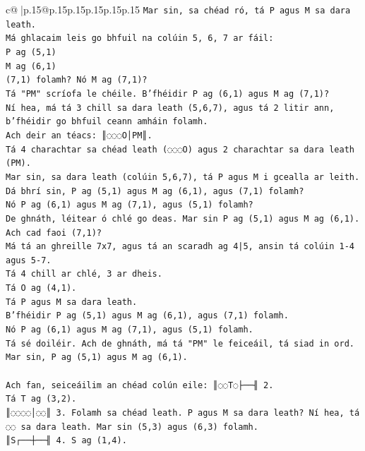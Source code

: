\documentclass{article}
\begin{document}
{\begin{supertabular}{c@{$\;$}|p{.15\linewidth}@{}p{.15\linewidth}p{.15\linewidth}p{.15\linewidth}p{.15\linewidth}p{.15\linewidth}}
{{{\texttt{Mar sin, sa chéad ró, tá P agus M sa dara leath.} \\
\texttt{Má ghlacaim leis go bhfuil na colúin 5, 6, 7 ar fáil:} \\
\texttt{P ag (5,1)} \\
\texttt{M ag (6,1)} \\
\texttt{(7,1) folamh? Nó M ag (7,1)?} \\
\texttt{Tá "PM" scríofa le chéile. B'fhéidir P ag (6,1) agus M ag (7,1)?} \\
\texttt{Ní hea, má tá 3 chill sa dara leath (5,6,7), agus tá 2 litir ann, b'fhéidir go bhfuil ceann amháin folamh.} \\
\texttt{Ach deir an téacs: ║◌◌◌O│PM║.} \\
\texttt{Tá 4 charachtar sa chéad leath (◌◌◌O) agus 2 charachtar sa dara leath (PM).} \\
\texttt{Mar sin, sa dara leath (colúin 5,6,7), tá P agus M i gcealla ar leith.} \\
\texttt{Dá bhrí sin, P ag (5,1) agus M ag (6,1), agus (7,1) folamh?} \\
\texttt{Nó P ag (6,1) agus M ag (7,1), agus (5,1) folamh?} \\
\texttt{De ghnáth, léitear ó chlé go deas. Mar sin P ag (5,1) agus M ag (6,1). Ach cad faoi (7,1)?} \\
\texttt{Má tá an ghreille 7x7, agus tá an scaradh ag 4|5, ansin tá colúin 1{-}4 agus 5{-}7.} \\
\texttt{Tá 4 chill ar chlé, 3 ar dheis.} \\
\texttt{Tá O ag (4,1).} \\
\texttt{Tá P agus M sa dara leath.} \\
\texttt{B'fhéidir P ag (5,1) agus M ag (6,1), agus (7,1) folamh.} \\
\texttt{Nó P ag (6,1) agus M ag (7,1), agus (5,1) folamh.} \\
\texttt{Tá sé doiléir. Ach de ghnáth, má tá "PM" le feiceáil, tá siad in ord.} \\
\texttt{Mar sin, P ag (5,1) agus M ag (6,1).} \\
\\ 
\texttt{Ach fan, seiceáilim an chéad colún eile: ║◌◌T◌├──╢ 2.} \\
\texttt{Tá T ag (3,2).} \\
\texttt{║◌◌◌◌│◌◌║ 3. Folamh sa chéad leath. P agus M sa dara leath? Ní hea, tá ◌◌ sa dara leath. Mar sin (5,3) agus (6,3) folamh.} \\
\texttt{║S┌──┼──╢ 4. S ag (1,4).} \\
}}}
\end{supertabular}}
\end{document}
